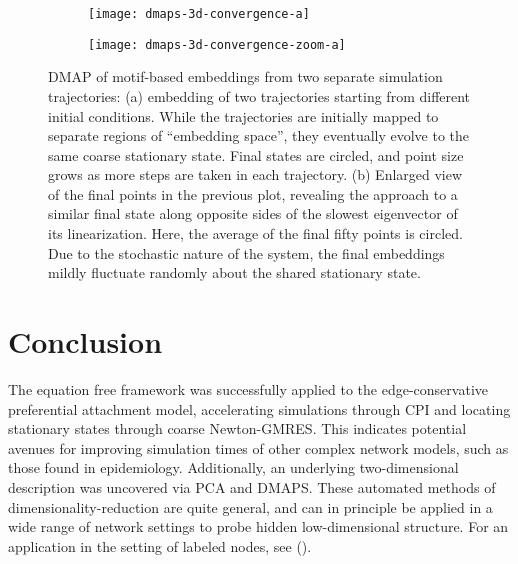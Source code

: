   \begin{figure}
    \vspace{-5mm} \centering
    \begin{subfigure}{0.49\textwidth}
      \centering
      \texttt{[image: dmaps-3d-convergence-a]}
      \subcaption{\label{fig:dmaps-results-regular}}
    \end{subfigure} %
    \begin{subfigure}{0.49\textwidth}
      \centering
      \texttt{[image: dmaps-3d-convergence-zoom-a]}
      \subcaption{\label{fig:dmaps-results-zoom}}
    \end{subfigure}%
    \caption[DMAP of motif-based embeddings when two trajectories are
    sampled]{DMAP of motif-based embeddings from two separate
      simulation trajectories: (a) embedding of two trajectories
      starting from different initial conditions. While the
      trajectories are initially mapped to separate regions of
      ``embedding space'', they eventually evolve to the same coarse
      stationary state.  Final states are circled, and point size
      grows as more steps are taken in each trajectory.  (b) Enlarged
      view of the final points in the previous plot, revealing the
      approach to a similar final state along opposite sides of the
      slowest eigenvector of its linearization.  Here, the average of
      the final fifty points is circled. Due to the stochastic nature
      of the system, the final embeddings mildly fluctuate randomly
      about the shared stationary state. \label{fig:dmaps-results}}
  \end{figure}

  \section{Conclusion}

  The equation free framework was successfully applied to the
  edge-conservative preferential attachment model, accelerating
  simulations through CPI and locating stationary states through
  coarse Newton-GMRES. This indicates potential avenues for improving
  simulation times of other complex network models, such as those
  found in epidemiology.
  Additionally, an underlying two-dimensional description was
  uncovered via PCA and DMAPS. These automated methods of
  dimensionality-reduction are quite general, and can in principle be
  applied in a wide range of network settings to probe hidden
  low-dimensional structure. For an application in the setting of
  labeled nodes, see ({\cite{kattis_modeling_2016}}).


